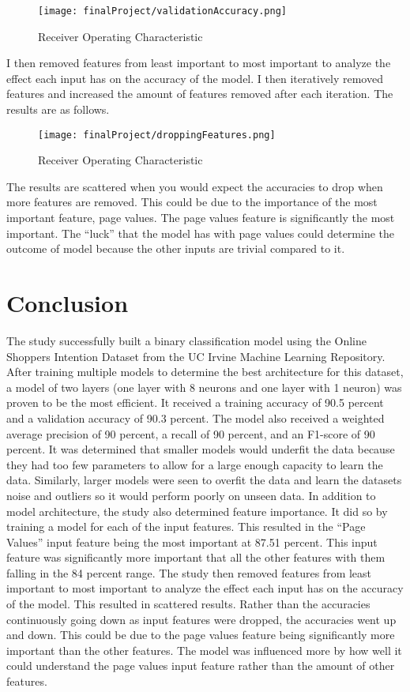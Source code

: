 \documentclass{article}
\begin{document}
\begin{figure}[H]
\centering
\texttt{[image: finalProject/validationAccuracy.png]}
\caption{Receiver Operating Characteristic}
\label{fig:my_label}
\end{figure}

I then removed features from least important to most important to analyze the effect each input has on the accuracy of the model. I then iteratively removed features and increased the amount of features removed after each iteration. The results are as follows.

\begin{figure}[H]
\centering
\texttt{[image: finalProject/droppingFeatures.png]}
\caption{Receiver Operating Characteristic}
\label{fig:my_label}
\end{figure}

The results are scattered when you would expect the accuracies to drop when more features are removed. This could be due to the importance of the most important feature, page values. The page values feature is significantly the most important. The “luck” that the model has with page values could determine the outcome of model because the other inputs are trivial compared to it.

\section{Conclusion}
The study successfully built a binary classification model using the Online Shoppers Intention Dataset from the UC Irvine Machine Learning Repository. After training multiple models to determine the best architecture for this dataset, a model of two layers (one layer with 8 neurons and one layer with 1 neuron) was proven to be the most efficient. It received a training accuracy of 90.5 percent and a validation accuracy of 90.3 percent. The model also received a weighted average precision of 90 percent, a recall of 90 percent, and an F1-score of 90 percent. It was determined that smaller models would underfit the data because they had too few parameters to allow for a large enough capacity to learn the data. Similarly, larger models were seen to overfit the data and learn the datasets noise and outliers so it would perform poorly on unseen data. In addition to model architecture, the study also determined feature importance. It did so by training a model for each of the input features. This resulted in the “Page Values” input feature being the most important at 87.51 percent. This input feature was significantly more important that all the other features with them falling in the 84 percent range. The study then removed features from least important to most important to analyze the effect each input has on the accuracy of the model. This resulted in scattered results. Rather than the accuracies continuously going down as input features were dropped, the accuracies went up and down. This could be due to the page values feature being significantly more important than the other features. The model was influenced more by how well it could understand the page values input feature rather than the amount of other features. 
\end{document}
